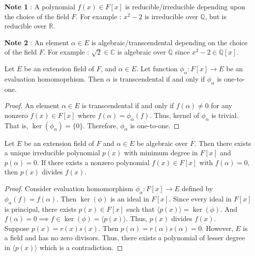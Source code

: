 \textbf{Note 1} : A polynomial $f(x) \in F[x]$ is reducible/irreducible depending upon the choice of the field $F$.
For example : $x^2-2$ is irreducible over $\mathbb{Q}$, but is reducible over $\mathbb{R}$.

\textbf{Note 2} : An element $\alpha \in E$ is algebraic/transcendental depending on the choice of the field $F$.
For example : $\sqrt{2} \in \mathbb{C}$ is algebraic over $\mathbb{Q}$ since $x^2-2 \in \mathbb{Q}[x]$.

\begin{theorem}
	Let $E$ be an extension field of $F$, and $\alpha \in E$.
	Let function $\phi_\alpha : F[x] \to E$ be an evaluation homomoprhism.
	Then $\alpha$ is transcendental  if and only if $\phi_\alpha$ is one-to-one.
\end{theorem}
\begin{proof}
	An element $\alpha \in E$ is transcendental if and only if $f(\alpha) \ne 0$ for any nonzero $f(x) \in F[x]$ where $f(\alpha) = \phi_\alpha(f)$.
	Thus, kernel of $\phi_\alpha$ is trivial.
	That is, $\ker(\phi_\alpha) = \{ 0 \}$.
	Therefore, $\phi_\alpha$ is one-to-one.
\end{proof}

\begin{theorem}
	Let $E$ be an extension field of $F$ and $\alpha \in E$ be algebraic over $F$.
	Then there exists a unique irreducible polynomial $p(x)$ with minimum degree in $F[x]$ and $p(\alpha) = 0$.
	If there exists a nonzero polynomial $f(x) \in F[x]$ with $f(\alpha) = 0$, then $p(x)$ divides $f(x)$.
\end{theorem}
\begin{proof}
	Consider evaluation homomorphism $\phi_\alpha : F[x] \to E$ defined by $\phi_\alpha(f) = f(\alpha)$.
	Then $\ker(\phi)$ is an ideal in $F[x]$.
	Since every ideal in $F[x]$ is principal, there exists $p(x) \in F[x]$ such that $\langle p(x) \rangle = \ker(\phi)$.
	And $f(\alpha) = 0 \implies f \in \ker(\phi) = \langle p(x) \rangle$.
	Thus, $p(x)$ divides $f(x)$.\\

	Suppose $p(x) = r(x)s(x)$.
	Then $p(\alpha) = r(\alpha)s(\alpha) = 0$.
	However, $E$ is a field and has no zero divisors.
	Thus, there exists a polynomial of lesser degree in $\langle p(x) \rangle$ which is a contradiction.
\end{proof}

